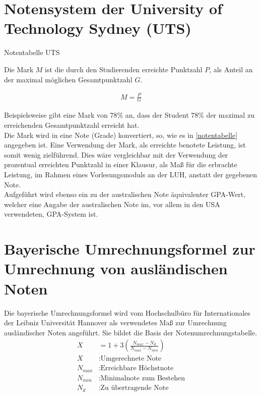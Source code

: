 \documentclass[12pt]{scrartcl}
\begin{document}
\section{Notensystem der University of Technology Sydney (UTS)} 
\begin{table}[!ht]
    \centering
    \caption{Notentabelle UTS}
    \label{notentabelle}
\end{table}
Die Mark $M$ ist die durch den Studierenden erreichte Punktzahl $P$, als Anteil an der maximal möglichen Gesamtpunktzahl $G$. 

\begin{align*}
    M = \frac{P}{G}
\end{align*}

Beispielsweise gibt eine Mark von $78 \%$ an, dass der Student $78 \%$ der maximal zu erreichenden Gesamtpunktzahl erreicht hat. \\
Die Mark wird in eine Note (Grade) konvertiert, so, wie es in \autoref{notentabelle} angegeben ist. Eine Verwendung der Mark, als erreichte benotete Leistung, ist somit wenig zielführend. Dies wäre vergleichbar mit der Verwendung der prozentual erreichten Punktzahl in einer Klausur, als Maß für die erbrachte Leistung, im Rahmen eines Vorlesungsmoduls an der LUH, anstatt der gegebenen Note. \\
Aufgeführt wird ebenso ein zu der australischen Note äquivalenter GPA-Wert, welcher eine Angabe der australischen Note im, vor allem in den USA verwendeten, GPA-System ist. 
\newpage

\section{Bayerische Umrechnungsformel zur Umrechnung von ausländischen Noten}
Die bayerische Umrechnungsformel wird vom Hochschulbüro für Internationales der Leibniz Universität Hannover als verwendetes Maß zur Umrechnung ausländischer Noten angeführt. Sie bildet die Basis der Notenumrechnungstabelle. \cite{LUHNotenumrechnung}
\begin{align*}
    X &= 1 + 3 \left(\frac{N_{max}-N_d}{N_{max}-N_{min}}\right)\\[1ex]
    X &: \textrm{Umgerechnete Note}\\[0.5ex]
    N_{max} &: \textrm{Erreichbare Höchstnote}\\[0.5ex]
    N_{min} &: \textrm{Minimalnote zum Bestehen} \\[0.5ex]
    N_{d} &: \textrm{Zu übertragende Note}
\end{align*}
\end{document}

